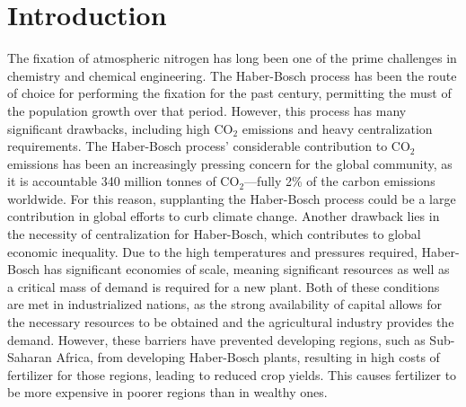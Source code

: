 \documentclass[catalysts,article,submit,moreauthors,pdftex,10pt,a4paper]{mdpi}
\theoremstyle{mdpi}
\newcounter{ex}
\newcounter{re}
\theoremstyle{mdpidefinition}
\begin{document}
\maketitle
\begin{abstract}
    
\end{abstract}
\section{Introduction}
The fixation of atmospheric nitrogen has long been one of the prime challenges in chemistry and chemical engineering.\cite{ritter_18, Schloegl_2003} The Haber-Bosch process has been the route of choice for performing the fixation for the past century, permitting the must of the population growth over that period.\cite{Smil_1999} However, this process has many significant drawbacks, including high CO$_2$ emissions and heavy centralization requirements.\cite{Comer_2019} The Haber-Bosch process' considerable contribution to CO$_2$ emissions has been an increasingly pressing concern for the global community, as it is accountable 340 million tonnes of CO$_2$---fully 2\% of the carbon emissions worldwide.\cite{gross_12, Schiffer_2017} For this reason, supplanting the Haber-Bosch process could be a large contribution in global efforts to curb climate change. Another drawback lies in the necessity of centralization for Haber-Bosch, which contributes to global economic inequality.\cite{Comer_2019} Due to the high temperatures and pressures required, Haber-Bosch has significant economies of scale, meaning significant resources as well as a critical mass of demand is required for a new plant. Both of these conditions are met in industrialized nations, as the strong availability of capital allows for the necessary resources to be obtained and the agricultural industry provides the demand.\cite{McArthur_2017} However, these barriers have prevented developing regions, such as Sub-Saharan Africa, from developing Haber-Bosch plants, resulting in high costs of fertilizer for those regions, leading to reduced crop yields.\cite{yuan_2014, IFDC_2012} This causes fertilizer to be more expensive in poorer regions than in wealthy ones.
\end{document}
